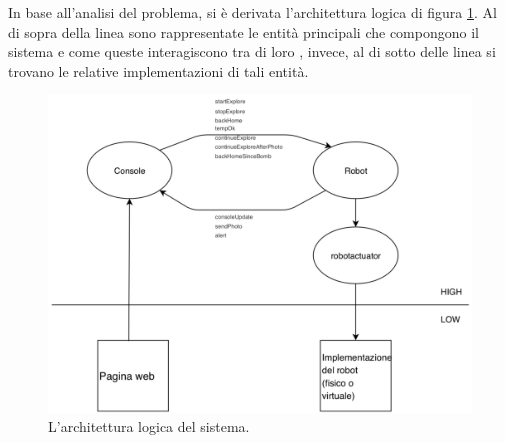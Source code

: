 In base all'analisi del problema, si è derivata l'architettura logica di figura \ref{fig:arch_logica}. Al di sopra della linea sono rappresentate le entità principali che compongono il sistema e come queste interagiscono tra di loro , invece, al di sotto delle linea si trovano le relative implementazioni di tali entità.

\begin{figure}  [H]
\includegraphics[width=\linewidth]{img/sprint0/arch_logica.png}
\caption{L'architettura logica del sistema.}
\label{fig:arch_logica}
\end{figure}



